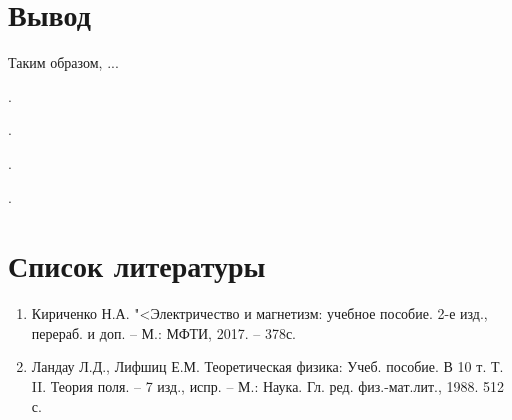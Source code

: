 \documentclass[12pt]{kiarticle}
\begin{document}

\section{Вывод}

Таким образом,  ...

.

.

.

.



\section*{Список литературы}

\begin{enumerate}
	
	\item Кириченко Н.А. "<Электричество и магнетизм: учебное пособие. 2-е изд., перераб. и доп. -- М.: МФТИ, 2017. -- 378с.
	
	\item Ландау Л.Д., Лифшиц Е.М. Теоретическая физика: Учеб. пособие. В 10 т. Т. II. Теория поля. -- 7 изд., испр. -- М.: Наука. Гл. ред. физ.-мат.лит., 1988. 512 с.
	
\end{enumerate}
\end{document}
